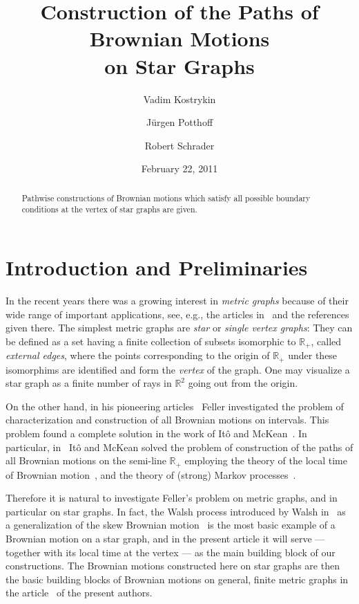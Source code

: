 \documentclass[11pt,a4paper]{amsart}
\date{February 22, 2011}
\title[Brownian Motions on Star Graphs]{%
Construction of the Paths of Brownian Motions\\
on Star Graphs}
\author[V.~Kostrykin]{Vadim Kostrykin}
\author[J.~Potthoff]{J\"urgen Potthoff}
\author[R.~Schrader]{Robert Schrader}
\newcommand{\1}{1}
\newcommand{\R}{\mathbb{R}}
\theoremstyle{remark}
\numberwithin{equation}{section}
\begin{document}
\begin{abstract}
Pathwise constructions of Brownian motions which satisfy all possible boundary
conditions at the vertex of star graphs are given.
\end{abstract}

\maketitle
\thispagestyle{empty}

\section{Introduction and Preliminaries} \label{sect_1}
In the recent years there was a growing interest in \emph{metric graphs} because of
their wide range of important applications, see, e.g., the articles
in~\cite{ExKe10} and the references given there. The simplest metric graphs
are \emph{star} or \emph{single vertex graphs}: They can be defined as a set
having a finite collection of subsets isomorphic to $\R_+$, called \emph{external edges},
where the points corresponding to the origin of $\R_+$ under these isomorphims are
identified and form the \emph{vertex} of the graph. One may visualize a star
graph as a finite number of rays in $\R^2$ going out from the origin.

On the other hand, in his pioneering articles~\cite{Fe52, Fe54, Fe54a} Feller
investigated the problem of characterization and construction of all Brownian
motions on intervals. This problem found a complete solution in the work of It\^o and
McKean~\cite{ItMc63, ItMc74}. In particular, in~\cite{ItMc63} It\^o and McKean solved
the problem of construction of the paths of all Brownian motions on the semi-line
$\R_+$ employing the theory of the local time of Brownian motion~\cite{Le48}, and
the theory of (strong) Markov processes~\cite{Bl57, Dy61, Dy65a, Dy65b, Hu56}.

Therefore it is natural to investigate Feller's problem on metric graphs, and
in particular on star graphs. In fact, the Walsh process introduced by Walsh
in~\cite{Wa78} as a generalization of the skew Brownian motion~\cite{ItMc74}
is the most basic example of a Brownian motion on a star graph, and in the
present article it will serve --- together with its local time at the vertex --- as
the main building block of our constructions. The Brownian motions constructed
here on star graphs are then the basic building blocks of Brownian motions on
general, finite metric graphs in the article~\cite{BMMG} of the present authors.
\end{document}
